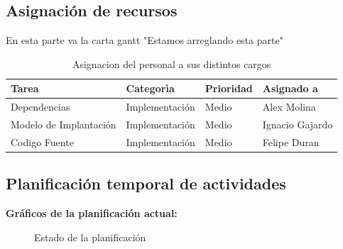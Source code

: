 \subsection{Asignación de recursos}
En esta parte va la carta gantt
"Estamos arreglando esta parte"

\begin{table}[H]
    \begin{center}
        \begin{tabular}{| m{6cm} | m{3cm} | m{2cm} | m{4cm} |}        
        	\hline 
        	Tarea & Categorìa & Prioridad & Asignado a\\
        	\hline
        	Dependencias & Implementación & Medio & Alex Molina\\
        	\hline
        	Modelo de Implantación & Implementación & Medio & Ignacio Gajardo\\
        	\hline
        	Codigo Fuente & Implementación & Medio & Felipe Duran\\
        	\hline
        \end{tabular}
    \caption{Asignacion del personal a sus distintos cargos}
    \end{center}
\end{table}
\subsection{Planificación temporal de actividades}
\textbf{Gráficos de la planificación actual:}

\begin{figure}[H]
 \centering
 \caption{Estado de la planificación}
\end{figure}